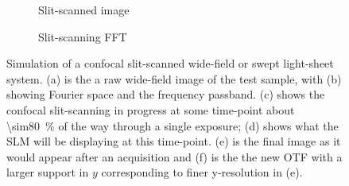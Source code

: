 \begin{figure}[ht]
\begin{subfigure}[t]{0.3\textwidth}
      \caption{Slit-scanned image}
  \end{subfigure}\quad
  \begin{subfigure}[t]{0.3\textwidth}
      \centering
      \caption{Slit-scanning \gls{FFT}}
  \end{subfigure}
  \caption[Simulation of a confocal slit-scanned wide-field or swept light-sheet system]{
  Simulation of a confocal slit-scanned wide-field or swept light-sheet system.
  (a) is the a raw wide-field image of the test sample, with (b) showing Fourier space and the frequency passband.
  (c) shows the confocal \gls{slit-scanning} in progress at some time-point about \SI{\sim80}{\percent} of the way through a single exposure;
  (d) shows what the \gls{SLM} will be displaying at this time-point.
  (e) is the final image as it would appear after an acquisition and (f) is the the new \gls{OTF} with a larger support in \(y\) corresponding to finer y-resolution in (e).
  }\label{fig:widefield_slit}
\end{figure}

